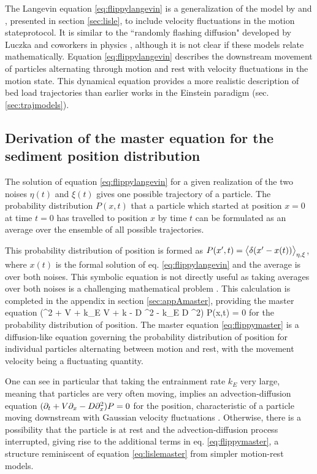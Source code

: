 The Langevin equation \ref{eq:flippylangevin} is a generalization of the model by \citet{Lisle1998} and \citet{Lajeunesse2017}, presented in section \ref{sec:lisle}, to include velocity fluctuations in the motion stateprotocol.
It is similar to the ``randomly flashing diffusion" developed by Luczka and coworkers in physics \citep{Luczka1992,Luczka1993,Luczka1995}, although it is not clear if these models relate mathematically.
Equation \ref{eq:flippylangevin} describes the downstream movement of particles alternating through motion and rest with velocity fluctuations in the motion state. This dynamical equation provides a more realistic description of bed load trajectories than earlier works in the Einstein paradigm (sec. \ref{sec:trajmodels}).

\subsection{Derivation of the master equation for the sediment position distribution}
\label{sec:floppymastereq}
The solution of equation \ref{eq:flippylangevin} for a given realization of the two noises $\eta(t)$ and $\xi(t)$ gives one possible trajectory of a particle. The probability distribution $P(x,t)$ that a particle which started at position $x=0$ at time $t=0$ has travelled to position $x$ by time $t$ can be formulated as an average over the ensemble of all possible trajectories.

This probability distribution of position is formed as $ P(x',t) = \big\langle \delta(x'-x(t))\big\rangle_{\eta,\xi} $, where $x(t)$ is the formal solution of eq. \ref{eq:flippylangevin} and the average is over both noises.
This symbolic equation is not directly useful as taking averages over both noises is a challenging mathematical problem \citep{Hanggi1978}. This calculation is completed in the appendix in section \ref{sec:appAmaster}, providing the master equation
\be (\pt^2 + V \px \pt + k_E V \px + k \pt - D \px^2 \pt - k_E D \px^2) P(x,t) = 0 \label{eq:flippymaster}\ee
for the probability distribution of position.
The master equation \ref{eq:flippymaster} is a diffusion-like equation governing the probability distribution of position for individual particles alternating between motion and rest, with the movement velocity being a fluctuating quantity.

One can see in particular that taking the entrainment rate $k_E$ very large, meaning that particles are very often moving, implies an advection-diffusion equation $(\partial_t + V\partial_x -D \partial_x^2)P=0$ for the position, characteristic of a particle moving downstream with Gaussian velocity fluctuations \citep{Ancey2014}. Otherwise, there is a possibility that the particle is at rest and the advection-diffusion process interrupted, giving rise to the additional terms in eq. \ref{eq:flippymaster}, a structure reminiscent of equation \ref{eq:lislemaster} from simpler motion-rest models.


